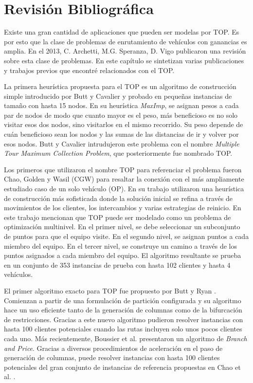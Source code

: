 

\chapter{Revisión Bibliográfica}

Existe una gran cantidad de aplicaciones que pueden ser modelas por TOP. Es por esto que la clase de problemas de enrutamiento de vehículos con ganancias es amplia. En el 2013, C. Archetti, M.G. Speranza, D. Vigo \cite{ArchettiSperanzaVigo} publicaron una revisión sobre esta clase de problemas. En este capítulo se sintetizan varias publicaciones y trabajos previos que encontré relacionados con el TOP.

\bigskip

La primera heurística propuesta para el TOP es un algoritmo de construcción simple introducido por Butt y Cavalier \cite{ButtCavalier} y probado en pequeñas instancias de tamaño con hasta 15 nodos. En su heurística \textit{MaxImp}, se asignan pesos a cada par de nodos de modo que cuanto mayor es el peso, más beneficioso es no solo visitar esos dos nodos, sino visitarlos en el mismo recorrido. Su peso depende de cuán beneficioso sean los nodos y las sumas de las distancias de ir y volver por esos nodos. Butt y Cavalier intrudujeron este problema con el nombre \textit{Multiple Tour Maximum Collection Problem}, que posteriormente fue nombrado TOP.

\bigskip

Los primeros que utilizaron el nombre TOP para referenciar el problema fueron Chao, Golden y Wasil (CGW) \cite{ChaoGoldenWasil} para resaltar la conexión con el más ampliamente estudiado caso de un solo vehículo (OP). En su trabajo utilizaron una heurística de construcción más sofisticada donde la solución inicial se refina a través de movimientos de los clientes, los intercambios y varias estrategias de reinicio. En este trabajo mencionan que TOP puede ser modelado como un problema de optimización multinivel. En el primer nivel, se debe seleccionar un subconjunto de puntos para que el equipo visite. En el segundo nivel, se asignan puntos a cada miembro del equipo. En el tercer nivel, se construye un camino a través de los puntos asignados a cada miembro del equipo. El algoritmo resultante se prueba en un conjunto de 353 instancias de prueba con hasta 102 clientes y hasta 4 vehículos.

\bigskip

El primer algoritmo exacto para TOP fue propuesto por Butt y Ryan \cite{ButtRyan}. Comienzan a partir de una formulación de partición configurada y su algoritmo hace un uso eficiente tanto de la generación de columnas como de la bifurcación de restricciones. Gracias a este nuevo algoritmo pudieron resolver instancias con hasta 100 clientes potenciales cuando las rutas incluyen solo unos pocos clientes cada uno. Más recientemente, Boussier et al. \cite{BoussierFeilletGendreau} presentaron un algoritmo de \textit{Branch and Price}. Gracias a diversos procedimientos de aceleración en el paso de generación de columnas, puede resolver instancias con hasta 100 clientes potenciales del gran conjunto de instancias de referencia propuestas en Chao et al. \cite{ChaoGoldenWasil}.

